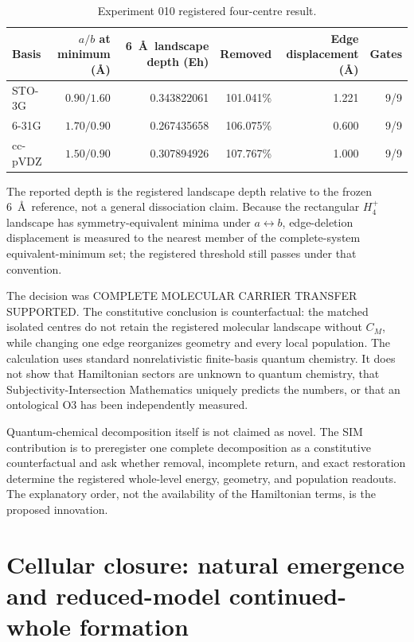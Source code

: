 \documentclass[11pt,a4paper]{article}
\begin{document}
\begin{table}[H]
\centering
\footnotesize
\caption{Experiment 010 registered four-centre result.}
\begin{tabular}{@{}lrrrrr@{}}
\toprule
Basis & $a/b$ at minimum (\AA) & 6~\AA\ landscape depth (Eh) & Removed & Edge displacement (\AA) & Gates \\
\midrule
STO-3G & $0.90/1.60$ & 0.343822061 & 101.041\% & 1.221 & 9/9 \\
6-31G & $1.70/0.90$ & 0.267435658 & 106.075\% & 0.600 & 9/9 \\
cc-pVDZ & $1.50/0.90$ & 0.307894926 & 107.767\% & 1.000 & 9/9 \\
\bottomrule
\end{tabular}
\end{table}

The reported depth is the registered landscape depth relative to the frozen 6~\AA\ reference, not a general dissociation claim. Because the rectangular $H_4^+$ landscape has symmetry-equivalent minima under $a\leftrightarrow b$, edge-deletion displacement is measured to the nearest member of the complete-system equivalent-minimum set; the registered threshold still passes under that convention.

The decision was \textsf{COMPLETE MOLECULAR CARRIER TRANSFER SUPPORTED}. The constitutive conclusion is counterfactual: the matched isolated centres do not retain the registered molecular landscape without $C_M$, while changing one edge reorganizes geometry and every local population. The calculation uses standard nonrelativistic finite-basis quantum chemistry. It does not show that Hamiltonian sectors are unknown to quantum chemistry, that Subjectivity-Intersection Mathematics uniquely predicts the numbers, or that an ontological O3 has been independently measured.

Quantum-chemical decomposition itself is not claimed as novel. The SIM contribution is to preregister one complete decomposition as a constitutive counterfactual and ask whether removal, incomplete return, and exact restoration determine the registered whole-level energy, geometry, and population readouts. The explanatory order, not the availability of the Hamiltonian terms, is the proposed innovation.

\section{Cellular closure: natural emergence and reduced-model continued-whole formation}
\end{document}
